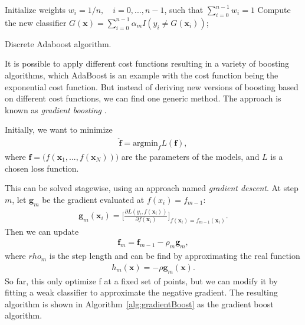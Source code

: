 \begin{algorithm}[H]
\SetAlgoLined
  Initialize weights $w_i = 1/n, \quad i=0,...,n-1$, such that $\sum_{i=0}^{n-1}w_i = 1$\;
 Compute the new classifier $G(\textbf{x}) = \sum_{i=0}^{n-1} \alpha_m I(y_i \neq G(\textbf{x}_i))$;
 \caption{Discrete Adaboost algorithm.}
 \label{alg:discreteAdaboost}
\end{algorithm}

It is possible to apply different cost functions resulting in a variety of boosting algorithms, which AdaBoost is an example with the cost function being the exponential cost function. But instead of deriving new versions of boosting based on different cost functions, we can find one generic method. The approach is known as \textit{gradient boosting} \cite{friedman2001}.

Initially, we want to minimize
\begin{align}
  \hat{\textbf{f}} = \text{argmin}_f L(\textbf{f}),
\end{align}
where $\textbf{f} = \big(f(\textbf{x}_1, ..., f(\textbf{x}_N)) \big)$ are the parameters of the models, and $L$ is a chosen loss function.

This can be solved stagewise, using an approach named \textit{gradient descent}. At step $m$, let $\textbf{g}_m$ be the gradient evaluated at $f(x_i) = f_{m-1}$:
\begin{align}
  \textbf{g}_m(\textbf{x}_i) = \Bigg[ \frac{\partial L(y_i, f(\textbf{x}_i))}{\partial f(\textbf{x}_i)} \Bigg]_{f(\textbf{x}_i)=f_{m-1}(\textbf{x}_i)}.
\end{align}
Then we can update
\begin{align}
  \textbf{f}_m = \textbf{f}_{m-1} - \rho_m \textbf{g}_m,
\end{align}
where $rho_m$ is the step length and can be find by approximating the real function
\begin{align}
  h_m(\textbf{x})= - \rho \textbf{g}_m(\textbf{x}).
\end{align}
So far, this only optimize f at a fixed set of points, but we can modify it by fitting a weak classifier to approximate the negative gradient. The resulting algorithm is shown in Algorithm~\ref{alg:gradientBoost} as the gradient boost algorithm.

